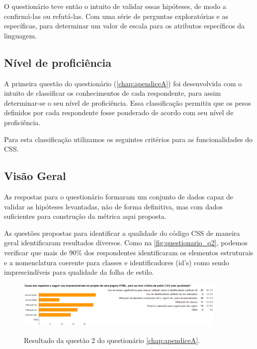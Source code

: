 O questionário teve então o intuito de validar essas hipóteses, de modo a confirmá-las ou refutá-las. Com uma série de perguntas exploratórias e as específicas, para determinar um valor de escala para os atributos específicos da linguagem.

\subsection{Nível de proficiência}

A primeira questão do questionário (\autoref{chap:apendiceA}) foi desenvolvida com o intuito de classificar os conhecimentos de cada respondente, para assim determinar-se o seu nível de proficiência. Essa classificação permitiu que os pesos definidos por cada respondente fosse ponderado de acordo com seu nível de proficiência.

Para esta classificação utilizamos os seguintes critérios para as funcionalidades do CSS.



\subsection{Visão Geral}

As respostas para o questionário formaram um conjunto de dados capaz de validar as hipóteses levantadas, não de forma definitiva, mas com dados suficientes para construção da métrica aqui proposta.

As questões propostas para identificar a qualidade do código CSS de maneira geral identificaram resultados diversos. Como na \autoref{fig:questionario_q2}, podemos verificar que mais de 90\% dos respondentes identificaram os elementos estruturais e a nomenclatura coerente para classes e identificadores (id's) como sendo imprescindíveis para qualidade da folha de estilo.

\begin{figure}[!htb]
	\centering
	\caption{Resultado da questão 2 do questionário \autoref{chap:apendiceA}.}
	\includegraphics[width=0.9\textwidth]{./04-figuras/questionario_q2}
	\label{fig:questionario_q2}
\end{figure}

